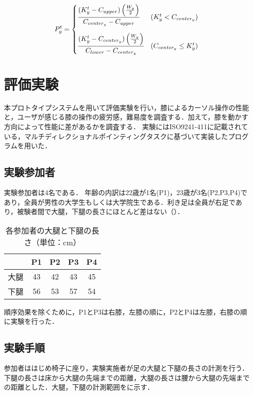 \documentclass[submit, techrep]{ipsj}
\begin{document}
\begin{eqnarray}
	\label{eq:calc_py1}
	P^t_y = 
	\begin{cases}
		\cfrac{(K^t_y - C_{upper}) \left( \frac{W_y}{2} \right)}{C_{center_y} - C_{upper}} & (K^t_y < C_{center_y}) 
		\vspace{10pt} \\
		\cfrac{(K^t_y - C_{center_y}) \left( \frac{W_y}{2} \right)}{C_{lower} - C_{center_y}} & (C_{center_y} \leq K^t_y)
	\end{cases}
\end{eqnarray}
\vline
\section{評価実験}
本プロトタイプシステムを用いて評価実験を行い，膝によるカーソル操作の性能と，ユーザが感じる膝の操作の疲労感，難易度を調査する．加えて，膝を動かす方向によって性能に差があるかを調査する．
実験にはISO9241-411\cite{9241411}に記載されている，マルチディレクショナルポインティングタスクに基づいて実装したプログラムを用いた．

\subsection{実験参加者}
実験参加者は4名である．
年齢の内訳は22歳が1名(P1)，23歳が3名(P2,P3,P4)であり，全員が男性の大学生もしくは大学院生である．利き足は全員が右足であり，被験者間で大腿，下腿の長さにほとんど差はない（）．
\begin{table}[tb]
	\begin{center}
	\caption{各参加者の大腿と下腿の長さ（単位：cm）}
		\begin{tabular}{|c|c|c|c|c|}
		\hline
			& P1 & P2 & P3 & P4 \\ \hline
		大腿 & 43 & 42 & 43 & 45 \\ \hline
		下腿 & 56 & 53 & 57 & 54 \\ \hline
		\end{tabular}
		\label{tb:length}
	\end{center}
\end{table}

順序効果を除くために，P1とP3は右膝，左膝の順に，P2とP4は左膝，右膝の順に実験を行った．
\subsection{実験手順}
参加者ははじめ椅子に座り，実験実施者が足の大腿と下腿の長さの計測を行う．下腿の長さは床から大腿の先端までの距離，大腿の長さは腰から大腿の先端までの距離とした．大腿，下腿の計測範囲をに示す．
\end{document}
